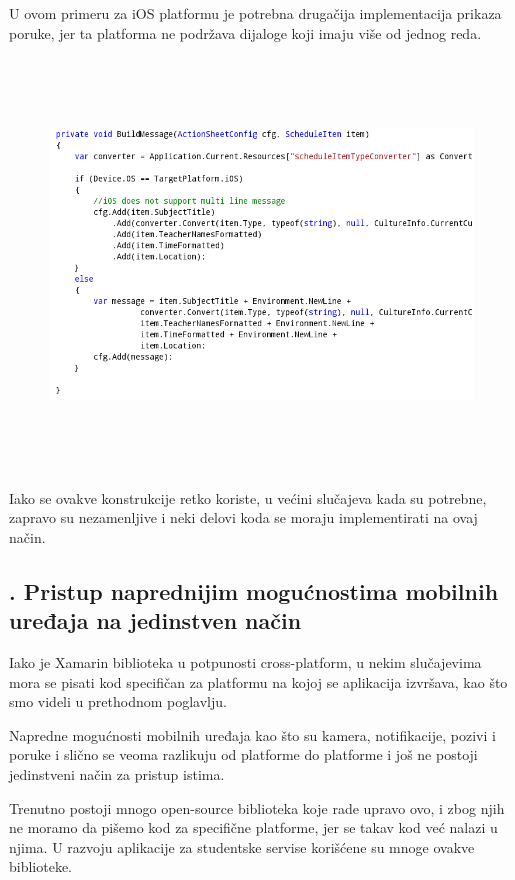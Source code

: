 \documentclass[a4paper]{article}
\begin{document}
U ovom primeru za iOS platformu je potrebna drugačija implementacija
prikaza poruke, jer ta platforma ne podržava dijaloge koji imaju više
od jednog reda.

\begin{figure}
\centering
\includegraphics[width=170mm,height=109.26mm]{msc-img67.png}
\end{figure}
Iako se ovakve konstrukcije retko koriste, u većini slučajeva kada su
potrebne, zapravo su nezamenljive i neki delovi koda se moraju
implementirati na ovaj način.

\subsection[7.10. Pristup naprednijim mogućnostima mobilnih uređaja na
jedinstven način]{. Pristup naprednijim mogućnostima
mobilnih uređaja na jedinstven način}
\hypertarget{RefHeadingToc875882405265}{}Iako je Xamarin biblioteka u
potpunosti cross-platform, u nekim slučajevima mora se pisati kod
specifičan za platformu na kojoj se aplikacija izvršava, kao što smo
videli u prethodnom poglavlju.

Napredne mogućnosti mobilnih uređaja kao što su kamera, notifikacije,
pozivi i poruke i slično se veoma razlikuju od platforme do platforme i
još ne postoji jedinstveni način za pristup istima.

Trenutno postoji mnogo open-source biblioteka koje rade upravo ovo, i
zbog njih ne moramo da pišemo kod za specifične platforme, jer se takav
kod već nalazi u njima. U razvoju aplikacije za studentske servise
korišćene su mnoge ovakve biblioteke.
\end{document}
